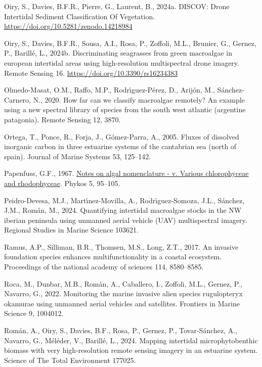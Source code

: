 \documentclass[
  letterpaper,
  DIV=11,
  numbers=noendperiod]{scrartcl}
\newlength{\cslhangindent}
\newenvironment{CSLReferences}[2] %
 {\begin{list}{}{%
  \setlength{\itemindent}{0pt}
  \setlength{\leftmargin}{0pt}
  \setlength{\parsep}{0pt}
  \ifodd #1
   \setlength{\leftmargin}{\cslhangindent}
   \setlength{\itemindent}{-1\cslhangindent}
  \fi
  \setlength{\itemsep}{#2\baselineskip}}}
 {\end{list}}
\begin{document}
\begin{CSLReferences}{1}{0}
Oiry, S., Davies, B.F.R., Pierre, G., Laurent, B., 2024a. {DISCOV: Drone
Intertidal Sediment Classification Of Vegetation}.
\url{https://doi.org/10.5281/zenodo.14218984}

Oiry, S., Davies, B.F.R., Sousa, A.I., Rosa, P., Zoffoli, M.L., Brunier,
G., Gernez, P., Barillé, L., 2024b. Discriminating seagrasses from green
macroalgae in european intertidal areas using high-resolution
multispectral drone imagery. Remote Sensing 16.
\url{https://doi.org/10.3390/rs16234383}

Olmedo-Masat, O.M., Raffo, M.P., Rodrı́guez-Pérez, D., Arijón, M.,
Sánchez-Carnero, N., 2020. How far can we classify macroalgae remotely?
An example using a new spectral library of species from the south west
atlantic (argentine patagonia). Remote Sensing 12, 3870.

Ortega, T., Ponce, R., Forja, J., Gómez-Parra, A., 2005. Fluxes of
dissolved inorganic carbon in three estuarine systems of the cantabrian
sea (north of spain). Journal of Marine Systems 53, 125--142.

Papenfuss, G.F., 1967.
\href{https://marinespecies.org/aphia.php?p=sourcedetails&id=303450}{Notes
on algal nomenclature - v. Various chlorophyceae and rhodophyceae}.
Phykos 5, 95--105.

Peidro-Devesa, M.J., Martı́nez-Movilla, A., Rodrı́guez-Somoza, J.L.,
Sánchez, J.M., Román, M., 2024. Quantifying intertidal macroalgae stocks
in the NW iberian peninsula using unmanned aerial vehicle (UAV)
multispectral imagery. Regional Studies in Marine Science 103621.

Ramus, A.P., Silliman, B.R., Thomsen, M.S., Long, Z.T., 2017. An
invasive foundation species enhances multifunctionality in a coastal
ecosystem. Proceedings of the national academy of sciences 114,
8580--8585.

Roca, M., Dunbar, M.B., Román, A., Caballero, I., Zoffoli, M.L., Gernez,
P., Navarro, G., 2022. Monitoring the marine invasive alien species
rugulopteryx okamurae using unmanned aerial vehicles and satellites.
Frontiers in Marine Science 9, 1004012.

Román, A., Oiry, S., Davies, B.F., Rosa, P., Gernez, P., Tovar-Sánchez,
A., Navarro, G., Méléder, V., Barillé, L., 2024. Mapping intertidal
microphytobenthic biomass with very high-resolution remote sensing
imagery in an estuarine system. Science of The Total Environment 177025.


\end{CSLReferences}
\end{document}
